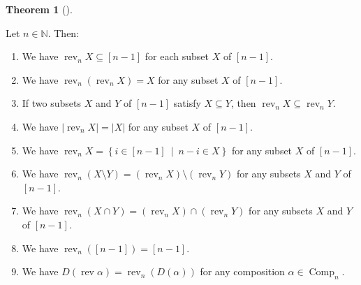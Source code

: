 \documentclass[numbers=enddot,12pt,final,onecolumn,notitlepage]{scrartcl}%
\theoremstyle{definition}
\newtheorem{theo}{Theorem}[section]
\newenvironment{theorem}[1][]
{\begin{theo}[#1]\begin{leftbar}}
{\end{leftbar}\end{theo}}
\begin{document}
\begin{theorem}
\label{thm.rev-rev}Let $n\in\mathbb{N}$. Then:

\begin{enumerate}
\item[\textbf{(a)}] We have $\operatorname*{rev}\nolimits_{n}X\subseteq\left[
n-1\right]  $ for each subset $X$ of $\left[  n-1\right]  $.

\item[\textbf{(b)}] We have $\operatorname*{rev}\nolimits_{n}\left(
\operatorname*{rev}\nolimits_{n}X\right)  =X$ for any subset $X$ of $\left[
n-1\right]  $.

\item[\textbf{(c)}] If two subsets $X$ and $Y$ of $\left[  n-1\right]  $
satisfy $X\subseteq Y$, then $\operatorname*{rev}\nolimits_{n}X\subseteq
\operatorname*{rev}\nolimits_{n}Y$.

\item[\textbf{(d)}] We have $\left\vert \operatorname*{rev}\nolimits_{n}%
X\right\vert =\left\vert X\right\vert $ for any subset $X$ of $\left[
n-1\right]  $.

\item[\textbf{(e)}] We have $\operatorname*{rev}\nolimits_{n}X=\left\{
i\in\left[  n-1\right]  \ \mid\ n-i\in X\right\}  $ for any subset $X$ of
$\left[  n-1\right]  $.

\item[\textbf{(f)}] We have $\operatorname*{rev}\nolimits_{n}\left(
X\setminus Y\right)  =\left(  \operatorname*{rev}\nolimits_{n}X\right)
\setminus\left(  \operatorname*{rev}\nolimits_{n}Y\right)  $ for any subsets
$X$ and $Y$ of $\left[  n-1\right]  $.

\item[\textbf{(g)}] We have $\operatorname*{rev}\nolimits_{n}\left(  X\cap
Y\right)  =\left(  \operatorname*{rev}\nolimits_{n}X\right)  \cap\left(
\operatorname*{rev}\nolimits_{n}Y\right)  $ for any subsets $X$ and $Y$ of
$\left[  n-1\right]  $.

\item[\textbf{(h)}] We have $\operatorname*{rev}\nolimits_{n}\left(  \left[
n-1\right]  \right)  =\left[  n-1\right]  $.

\item[\textbf{(i)}] We have $D\left(  \operatorname*{rev}\alpha\right)
=\operatorname*{rev}\nolimits_{n}\left(  D\left(  \alpha\right)  \right)  $
for any composition $\alpha\in\operatorname*{Comp}\nolimits_{n}$.
\end{enumerate}
\end{theorem}
\end{document}
